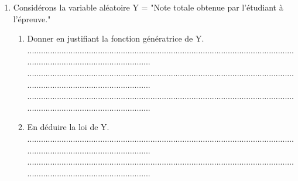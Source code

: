 \documentclass{article}
\begin{document}
\begin{footnotesize}
\begin{enumerate}
\begin{enumerate}
        ...........................................................................................................................................................................\newline
        ...........................................................................................................................................................................\newline
        ...........................................................................................................................................................................\newline
        ...........................................................................................................................................................................\newline\newline
    \end{enumerate}
    \item Considérons la variable aléatoire Y = "Note totale obtenue par l'étudiant à l'épreuve."
    \begin{enumerate}
        \item Donner en justifiant la fonction génératrice de Y.\newline\newline
        ...........................................................................................................................................................................\newline
        ...........................................................................................................................................................................\newline
        ...........................................................................................................................................................................\newline\newline
        \item En déduire la loi de Y.\newline\newline
        ...........................................................................................................................................................................\newline
        ...........................................................................................................................................................................\newline

\end{enumerate}
\end{enumerate}
\end{footnotesize}
\end{document}
